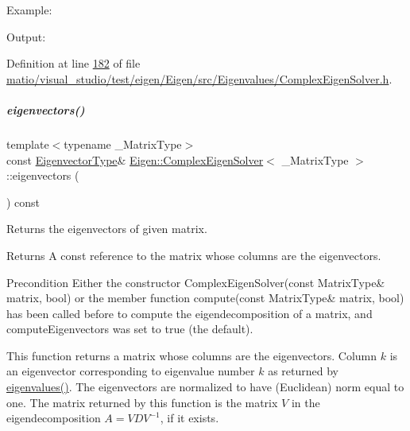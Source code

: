 Example\+: 
\begin{DoxyCodeInclude}
\end{DoxyCodeInclude}
 Output\+: 
\begin{DoxyVerbInclude}
\end{DoxyVerbInclude}
 

Definition at line \hyperlink{matio_2visual__studio_2test_2eigen_2_eigen_2src_2_eigenvalues_2_complex_eigen_solver_8h_source_l00182}{182} of file \hyperlink{matio_2visual__studio_2test_2eigen_2_eigen_2src_2_eigenvalues_2_complex_eigen_solver_8h_source}{matio/visual\+\_\+studio/test/eigen/\+Eigen/src/\+Eigenvalues/\+Complex\+Eigen\+Solver.\+h}.

\mbox{\label{group___eigenvalues___module_a3aa5e27800349990778da8fa532c1270}} 
\subparagraph{\texorpdfstring{eigenvectors()}{eigenvectors()}\hspace{0.1cm}{\footnotesize\ttfamily [1/2]}}
{\footnotesize\ttfamily template$<$typename \+\_\+\+Matrix\+Type$>$ \\
const \hyperlink{group___eigenvalues___module_a67cd4d20590abfd86b2639c4c8ea3dd6}{Eigenvector\+Type}\& \hyperlink{group___eigenvalues___module_class_eigen_1_1_complex_eigen_solver}{Eigen\+::\+Complex\+Eigen\+Solver}$<$ \+\_\+\+Matrix\+Type $>$\+::eigenvectors (\begin{DoxyParamCaption}{ }\end{DoxyParamCaption}) const\hspace{0.3cm}{\ttfamily [inline]}}



Returns the eigenvectors of given matrix. 

\begin{DoxyReturn}{Returns}
A const reference to the matrix whose columns are the eigenvectors.
\end{DoxyReturn}
\begin{DoxyPrecond}{Precondition}
Either the constructor Complex\+Eigen\+Solver(const Matrix\+Type\& matrix, bool) or the member function compute(const Matrix\+Type\& matrix, bool) has been called before to compute the eigendecomposition of a matrix, and {\ttfamily compute\+Eigenvectors} was set to true (the default).
\end{DoxyPrecond}
This function returns a matrix whose columns are the eigenvectors. Column $ k $ is an eigenvector corresponding to eigenvalue number $ k $ as returned by \hyperlink{group___eigenvalues___module_a10c25c7620e7faedcd39991cce3a757b}{eigenvalues()}. The eigenvectors are normalized to have (Euclidean) norm equal to one. The matrix returned by this function is the matrix $ V $ in the eigendecomposition $ A = V D V^{-1} $, if it exists.

